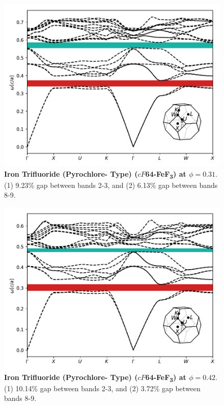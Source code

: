 \documentclass[fleqn,amsmath,amssymb,superscriptaddress, reprint,prl]{revtex4-1}
\begin{document}
\begin{figure}
\includegraphics[width=0.9\linewidth]{workspace/9e61af0bf048e3a2b82d57f6e9910037/images/r=15.pdf}
	\caption{\textbf{Iron Trifluoride (Pyrochlore- Type) ($cF$64-FeF\textsubscript{3}) at $\phi=0.31$}. (1) 9.23\% gap between bands 2-3, and (2) 6.13\% gap between bands 8-9.}
\end{figure}

\begin{figure}
\includegraphics[width=0.9\linewidth]{workspace/9e61af0bf048e3a2b82d57f6e9910037/images/r=17.pdf}
	\caption{\textbf{Iron Trifluoride (Pyrochlore- Type) ($cF$64-FeF\textsubscript{3}) at $\phi=0.42$}. (1) 10.14\% gap between bands 2-3, and (2) 3.72\% gap between bands 8-9.}
\end{figure}
\end{document}
